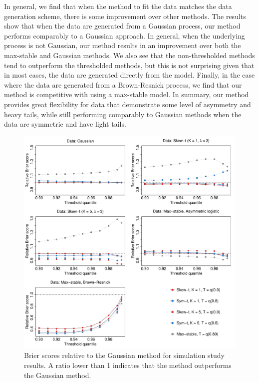 \documentclass[useAMS,usenatbib,referee]{biom}
\begin{document}
In general, we find that when the method to fit the data matches the data generation scheme, there is some improvement over other methods.
The results show that when the data are generated from a Gaussian process, our method performs comparably to a Gaussian approach.
In general, when the underlying process is not Gaussian, our method results in an improvement over both the max-stable and Gaussian methods.
We also see that the non-thresholded methods tend to outperform the thresholded methods, but this is not surprising given that in most cases, the data are generated directly from the model.
Finally, in the case where the data are generated from a Brown-Resnick process, we find that our method is competitive with using a max-stable model.
In summary, our method provides great flexibility for data that demonstrate some level of asymmetry and heavy tails, while still performing comparably to Gaussian methods when the data are symmetric and have light tails.

\begin{figure}
  \includegraphics[width=\linewidth]{plots/bsplots-mean.pdf}
  \caption{Brier scores relative to the Gaussian method for simulation study results. A ratio lower than 1 indicates that the method outperforms the Gaussian method.}
  \label{stfig:simbrierscores}
\end{figure}
\end{document}

